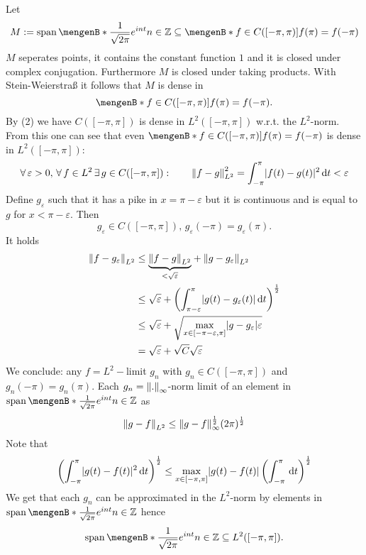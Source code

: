 \begin{beweis}
	Let \[
		M := \spn\set[\frac{1}{\sqrt{2 \pi}}e^{int}]{n \in \mathbb{Z}} \subseteq \set[f \in C([-\pi, \pi])]{f( \pi) = f(-\pi)}
	\]
	$M$ seperates points, it contains the constant function $1$ and it is closed under complex conjugation. Furthermore $M$ is closed under taking products. With Stein-Weierstraß it follows that $M$ is dense in 
	\[
		\set[f \in C([-\pi,\pi])]{f(\pi)= f(-\pi)}.
	\]
	By (2) we have $C([-\pi,\pi])$ is dense in $L^2([-\pi,\pi])$ w.r.t. the $L^2$-norm. From this one can see that even $\set[f \in C([-\pi,\pi])]{f(\pi)= f(-\pi)}$ is dense in $L^2([-\pi,\pi])$:
	\[
		\forall\,  \varepsilon>0, \,\forall\, f \in L^2 \,\exists\,g \in C([-\pi,\pi]): \qquad \norm{f-g}_{L^2}^2 = \int_{-\pi}^{\pi}\abs{f(t)-g(t)}^2 \,\mathrm{d}t < \varepsilon
	\] 
	Define $g _{\varepsilon}$ such that it has a pike in $x = \pi - \varepsilon$ but it is continuous and is equal to $g$ for $x < \pi -\varepsilon$. Then
	\[
		g _{\varepsilon} \in C([-\pi,\pi]), \,g _{\varepsilon}(- \pi) = g _{\varepsilon} ( \pi).
	\]
	It holds
	\begin{align*}
		\norm{f - g _{\varepsilon}}_{L^2} &\leq \underset{< \sqrt{\varepsilon}}{\underbrace{\norm{f-g}_{L^2}}} + 
		\norm{g - g _{\varepsilon}}_{L^2} \\
		&\leq  \sqrt{\varepsilon} + \left( \int_{\pi - \varepsilon}^{\pi} \abs{g(t)-g _{\varepsilon}(t)} \,\mathrm{d}t  \right)^{\frac{1}{2}} \\
		&\leq \sqrt{\varepsilon} + \sqrt{\max_{x \in [-\pi - \varepsilon, \pi]} \abs{g- g _{\varepsilon}}\varepsilon} \\
		&= \sqrt{\varepsilon} + \sqrt{C} \sqrt{\varepsilon}
	\end{align*}
	We conclude: any $f = L^2-$limit $g_n$ with $g_n \in C([-\pi,\pi])$ and $g_n(- \pi ) = g_n( \pi)$. Each $g_n = \norm{.}_\infty$-norm limit of an element in 
	$ \spn\set[\frac{1}{\sqrt{2 \pi}}e^{int}]{n \in \mathbb{Z}}$ as
	\[
		\norm{g-f}_{L^2} \leq \norm{g-f}^{\frac{1}{2}}_{\infty} (2 \pi)^{\frac{1}{2}}
	\]
	Note that
	\[
		\left( \int_{- \pi}^{\pi} \lvert g(t)-f(t)\rvert^2 \,\mathrm{d}t \right)^{\frac{1}{2}} \leq \max_{x \in [ - \pi, \pi]} \lvert g(t)- f(t)\rvert \left( \int_{- \pi}^{\pi} \,\mathrm{d}t \right)^{\frac{1}{2}}
	\]
	We get that each $g_n$ can be approximated in the $L^2$-norm by elements in $\spn\set[\frac{1}{\sqrt{2 \pi}}e^{int}]{n \in \mathbb{Z}}$ hence
	\[
		\spn\set[\frac{1}{\sqrt{2 \pi}}e^{int}]{n \in \mathbb{Z}} \subseteq L^2([- \pi,\pi]).
	\]
\end{beweis}

